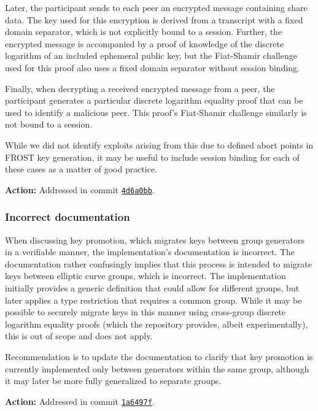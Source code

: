 \documentclass{article}
\begin{document}
Later, the participant sends to each peer an encrypted message containing share data.
The key used for this encryption is derived from a transcript with a fixed domain separator, which is not explicitly bound to a session.
Further, the encrypted message is accompanied by a proof of knowledge of the discrete logarithm of an included ephemeral public key, but the Fiat-Shamir challenge used for this proof also uses a fixed domain separator without session binding.

Finally, when decrypting a received encrypted message from a peer, the participant generates a particular discrete logarithm equality proof that can be used to identify a malicious peer.
This proof's Fiat-Shamir challenge similarly is not bound to a session.

While we did not identify exploits arising from this due to defined abort points in FROST key generation, it may be useful to include session binding for each of these cases as a matter of good practice.

\textbf{Action:} Addressed in commit \href{https://github.com/serai-dex/serai/commit/4d6a0bbd7d8a2c08a839d8ca9099a04c0e1a4500}{\texttt{4d6a0bb}}.


\subsubsection{Incorrect documentation}

When discussing key promotion, which migrates keys between group generators in a verifiable manner, the implementation's documentation is incorrect.
The documentation rather confusingly implies that this process is intended to migrate keys between elliptic curve groups, which is incorrect.
The implementation initially provides a generic definition that could allow for different groups, but later applies a type restriction that requires a common group.
While it may be possible to securely migrate keys in this manner using cross-group discrete logarithm equality proofs (which the repository provides, albeit experimentally), this is out of scope and does not apply.

Recommendation is to update the documentation to clarify that key promotion is currently implemented only between generators within the same group, although it may later be more fully generalized to separate groups.

\textbf{Action:} Addressed in commit \href{https://github.com/serai-dex/serai/commit/1a6497f37af9ecb0ded83bedac1eae6ead7a4770}{\texttt{1a6497f}}.
\end{document}
